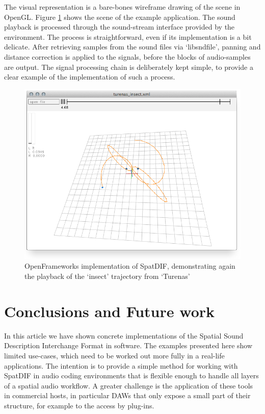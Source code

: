 \documentclass{article}
\begin{document}
The visual representation is a bare-bones wireframe drawing of the scene in OpenGL.
Figure \ref{fig:screenshot3} shows the scene of the example application.
The sound playback is processed through the sound-stream interface provided by the environment.
The process is straightforward, even if its implementation is a bit delicate.
After retrieving samples from the sound files via `libsndfile', panning and distance correction is applied to the signals, before the blocks of audio-samples are output.
The signal processing chain is deliberately kept simple, to provide a clear example of the implementation of such a process.

\begin{figure}[httb]
	\centering
	\includegraphics[width=\columnwidth]{of_screenshot.png}
	\caption{OpenFrameworks implementation of SpatDIF, demonstrating again the playback of the `insect' trajectory from `Turenas'} 
	\label{fig:screenshot3}
\end{figure}

\section{Conclusions and Future work}\label{sec:conclusions_future_work}

In this article we have shown concrete implementations of the Spatial Sound Description Interchange Format in software.
The examples presented here show limited use-cases, which need to be worked out more fully in a real-life applications.
The intention is to provide a simple method for working with SpatDIF in audio coding environments that is flexible enough to handle all layers of a spatial audio workflow. \cite{PetersSMC09}
A greater challenge is the application of these tools in commercial hosts, in particular DAWs that only expose a small part of their structure, for example to the access by plug-ins.
\end{document}
